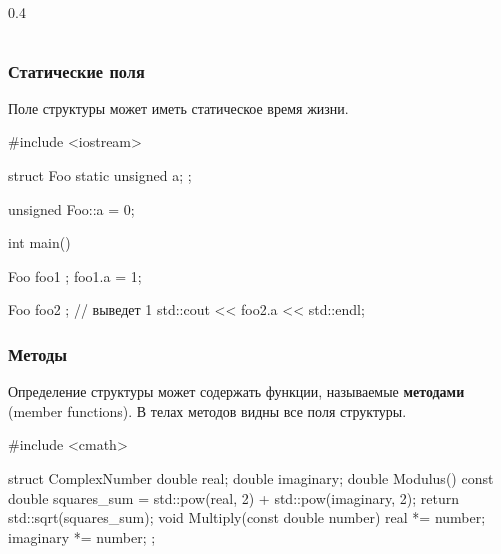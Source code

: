 \documentclass[compress, 8pt, aspectratio=169]{beamer}
\begin{document}
\begin{frame}[fragile]
\begin{columns}[T]
\begin{column}{0.4\textwidth}
        \end{column}

    \end{columns}

\end{frame}

\begin{frame}[fragile]

    \frametitle{Статические поля}

    Поле структуры может иметь статическое время жизни.

    \begin{myinplacelisting}[minted language=cpp]
#include <iostream>

struct Foo {
    static unsigned a;
};

unsigned Foo::a = 0;

int main() {
    Foo foo1 {};
    foo1.a = 1;

    Foo foo2 {};
    // выведет 1
    std::cout << foo2.a << std::endl;
}
    \end{myinplacelisting}

\end{frame}

\begin{frame}[fragile]

    \frametitle{Методы}

    \hfill\break
    Определение структуры может содержать функции, называемые
    \textbf{методами}\footnotemark{} (member functions).
    В телах методов видны все поля структуры.


    \begin{myinplacelisting}[minted language=cpp]
#include <cmath>

struct ComplexNumber {
    double real;
    double imaginary;
    double Modulus() {
        const double squares_sum =
            std::pow(real, 2) +
            std::pow(imaginary, 2);
        return std::sqrt(squares_sum);
    }
    void Multiply(const double number) {
        real *= number;
        imaginary *= number;
    }
};
    \end{myinplacelisting}

\end{frame}
\end{document}
